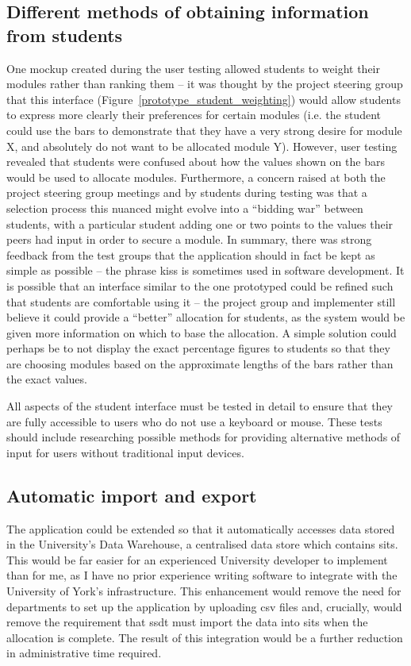 \subsection{Different methods of obtaining information from students}

One mockup created during the user testing allowed students to weight their
modules rather than ranking them -- it was thought by the project steering
group that this interface (Figure~\ref{prototype_student_weighting}) would
allow students to express more clearly their preferences for certain modules
(i.e. the student could use the bars to demonstrate that they have a very
strong desire for module X, and absolutely do not want to be allocated module
Y). However, user testing revealed that students were confused about how the
values shown on the bars would be used to allocate modules. Furthermore, a
concern raised at both the project steering group meetings and by students
during testing was that a selection process this nuanced might evolve into a
``bidding war'' between students, with a particular student adding one or two
points to the values their peers had input in order to secure a module. In
summary, there was strong feedback from the test groups that the application
should in fact be kept as simple as possible -- the phrase \gls{kiss} is
sometimes used in software development. It is possible that an interface
similar to the one prototyped could be refined such that students are
comfortable using it -- the project group and implementer still believe it
could provide a ``better'' allocation for students, as the system would be
given more information on which to base the allocation. A simple solution
could perhaps be to not display the exact percentage figures to students so
that they are choosing modules based on the approximate lengths of the bars
rather than the exact values.

All aspects of the student interface must be tested in detail to ensure that
they are fully accessible to users who do not use a keyboard or mouse. These
tests should include researching possible methods for providing alternative
methods of input for users without traditional input devices.

\subsection{Automatic import and export}
\label{sec:autoexport}

The application could be extended so that it automatically accesses data
stored in the University's Data Warehouse, a centralised data store which
contains \gls{sits}. This would be far easier for an experienced University
developer to implement than for me, as I have no prior experience writing
software to integrate with the University of York's infrastructure. This
enhancement would remove the need for departments to set up the application by
uploading \gls{csv} files and, crucially, would remove the requirement that
\gls{ssdt} must import the data into \gls{sits} when the allocation is
complete. The result of this integration would be a further reduction in
administrative time required.

